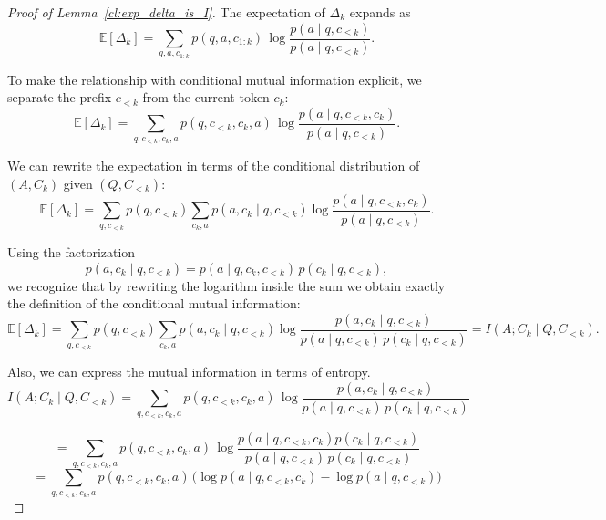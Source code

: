 \documentclass{article}
\begin{document}
\begin{proof}[Proof of Lemma~\ref{cl:exp_delta_is_I}]
The expectation of $\Delta_k$ expands as
\begin{equation*}
\mathbb{E}[\Delta_k] = \sum_{q,a,c_{1:k}} p(q,a,c_{1:k})\, \log\frac{p(a \mid q,c_{\le k})}{p(a \mid q,c_{<k})}.
\end{equation*}

To make the relationship with conditional mutual information explicit, we separate the prefix $c_{<k}$ from the current token $c_k$:
\begin{equation*}
\mathbb{E}[\Delta_k]
=
\sum_{q,c_{<k},c_k,a}
p(q,c_{<k},c_k,a)\,
\log\frac{p(a \mid q,c_{<k},c_k)}{p(a \mid q,c_{<k})}.
\end{equation*}

We can rewrite the expectation in terms of the conditional distribution of $(A,C_k)$ given $(Q,C_{<k})$:
\begin{equation*}
\mathbb{E}[\Delta_k] = \sum_{q,c_{<k}} p(q,c_{<k}) \sum_{c_k,a} p(a,c_k \mid q,c_{<k}) \log\frac{p(a \mid q,c_{<k},c_k)}{p(a \mid q,c_{<k})}.
\end{equation*}

Using the factorization
\begin{equation*}
p(a,c_k \mid q,c_{<k})
= p(a \mid q,c_k,c_{<k})\, p(c_k \mid q,c_{<k}),
\end{equation*}
we recognize that by rewriting the logarithm inside the sum we obtain exactly the definition of the conditional mutual information:
\begin{equation*}
\mathbb{E}[\Delta_k] = \sum_{q,c_{<k}} p(q,c_{<k}) \sum_{c_k,a} p(a,c_k \mid q,c_{<k}) \log\frac{p(a,c_k \mid q,c_{<k})}{p(a \mid q,c_{<k})\,p(c_k \mid q,c_{<k})} = I(A;C_k \mid Q,C_{<k}).
\end{equation*}

Also, we can express the mutual information in terms of entropy. 
\begin{equation*}
I(A;C_k \mid Q,C_{<k}) = \sum_{q,c_{<k},c_k,a}
p(q,c_{<k},c_k,a)\,\log\frac{p(a,c_k \mid q,c_{<k})}{p(a \mid q,c_{<k})\,p(c_k \mid q,c_{<k})}
\end{equation*}

\begin{equation*}
= \sum_{q,c_{<k},c_k,a}
p(q,c_{<k},c_k,a)\,\log\frac{p(a\mid q,c_{<k},c_k)p(c_k \mid q,c_{<k})}{p(a \mid q,c_{<k})\,p(c_k \mid q,c_{<k})}
\end{equation*}
\begin{equation*}
= \sum_{q,c_{<k},c_k,a}
p(q,c_{<k},c_k,a)\,\big(\log p(a\mid q,c_{<k},c_k) - \log p(a \mid q,c_{<k})\big)
\end{equation*}


\end{proof}
\end{document}
